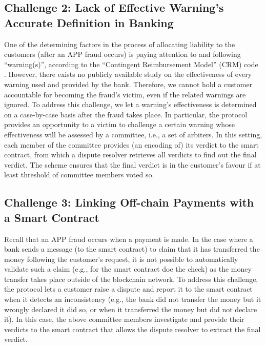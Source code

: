\subsection{Challenge 2: Lack of Effective Warning's Accurate Definition in Banking}

One of the determining  factors in the process of allocating liability to the customers (after an APP fraud occurs) is paying attention to and following ``warning(s)'', according to the ``Contingent Reimbursement Model'' (CRM) code \cite{CRM-code}. However, there exists  no  publicly available study  on the  effectiveness of every warning used and provided by the bank. Therefore, we cannot hold a customer accountable for becoming the fraud's victim,  even if the related warnings are ignored.    To address this challenge, we let a warning's effectiveness is determined on a case-by-case basis after the fraud takes place. In particular, the protocol provides an opportunity to a victim to  challenge a certain warning whose effectiveness will be assessed by a committee, i.e., a set of arbiters. In this setting, each member of the  committee provides (an encoding of) its verdict to the smart contract, from which a dispute resolver retrieves all verdicts to find out the final verdict. The scheme ensures that the final verdict is  in the customer's favour if at least threshold of committee members voted so. 







\subsection{Challenge 3: Linking Off-chain Payments with a Smart Contract}\label{sec::Linking Off-chain-Payments-with-contract}
 Recall that an APP fraud occurs when a payment is made. In the case where a  bank  sends a message (to the smart contract) to  claim  that it has transferred the money following the customer's request, it is not possible to automatically validate such a claim (e.g.,  for the smart contract doe the  check) as the money  transfer takes place  outside of the blockchain network. To address this challenge, the protocol lets a customer raise a dispute and report it to the smart contract when it detects an inconsistency (e.g., the bank did not transfer the money but it wrongly declared it did so, or when it transferred the money but did not declare it). In this case, the above committee members investigate and provide their  verdicts to the smart contract that allows the dispute resolver to extract the final verdict. 


